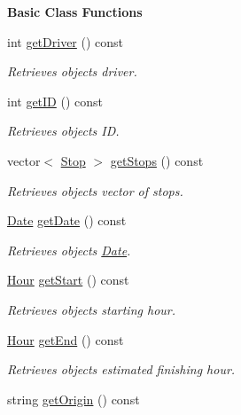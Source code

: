 \begin{Indent}\textbf{ Basic Class Functions}\par
\begin{DoxyCompactItemize}
\item 
int \hyperlink{group___trip_gabc996cddbc65b41987dd8d4d9776c729}{get\+Driver} () const
\begin{DoxyCompactList}\small\item\em Retrieves object\textquotesingle{}s driver. \end{DoxyCompactList}\item 
int \hyperlink{group___trip_ga61fea247b075bfac3f6115da4bd56ef5}{get\+ID} () const
\begin{DoxyCompactList}\small\item\em Retrieves object\textquotesingle{}s ID. \end{DoxyCompactList}\item 
vector$<$ \hyperlink{class_stop}{Stop} $>$ \hyperlink{group___trip_gae081fb958af544c9cad9002d5696fb33}{get\+Stops} () const
\begin{DoxyCompactList}\small\item\em Retrieves object\textquotesingle{}s vector of stops. \end{DoxyCompactList}\item 
\hyperlink{class_date}{Date} \hyperlink{group___trip_ga322346fb52d53fb0a94819059916d0fe}{get\+Date} () const
\begin{DoxyCompactList}\small\item\em Retrieves object\textquotesingle{}s \hyperlink{class_date}{Date}. \end{DoxyCompactList}\item 
\hyperlink{class_hour}{Hour} \hyperlink{group___trip_ga447efbf91bd4842daadac85d2bac4b9e}{get\+Start} () const
\begin{DoxyCompactList}\small\item\em Retrieves object\textquotesingle{}s starting hour. \end{DoxyCompactList}\item 
\hyperlink{class_hour}{Hour} \hyperlink{group___trip_ga6ed6b87b4206efe21fe2c6744c73061b}{get\+End} () const
\begin{DoxyCompactList}\small\item\em Retrieves object\textquotesingle{}s estimated finishing hour. \end{DoxyCompactList}\item 
string \hyperlink{group___trip_gaf63e96a9b31ad6def658944bc6a9f327}{get\+Origin} () const

\end{DoxyCompactItemize}
\end{Indent}
